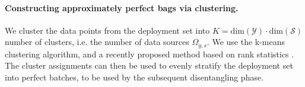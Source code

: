 \paragraph{Constructing approximately perfect bags via clustering.}
We cluster the data points from the deployment set into $K=\textrm{dim}(\mathcal{Y})\cdot \textrm{dim}(\mathcal{S})$ number of clusters, i.e. the number of data sources $\Omega_{y,s}$. 
%
We use the k-means clustering algorithm, and a recently proposed method based on rank statistics \citep{HanRebEhrVedetal20}.
%
The cluster assignments can then be used to evenly stratify the deployment set into perfect batches, to be used by the subsequent disentangling phase.
%

